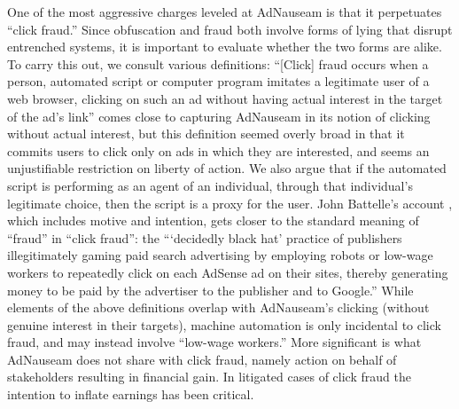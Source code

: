 \documentclass[conference]{IEEEtran}
\begin{document}
One of the most aggressive charges leveled at AdNauseam is that it perpetuates “click fraud.” Since obfuscation and fraud both involve forms of lying that disrupt entrenched systems, it is important to evaluate whether the two forms are alike. To carry this out, we consult various definitions: “[Click] fraud occurs when a person, automated script or computer program imitates a legitimate user of a web browser, clicking on such an ad without having actual interest in the target of the ad's link” \cite{Liu} comes close to capturing AdNauseam in its notion of clicking without actual interest, but this definition seemed overly broad in that it commits users to click only on ads in which they are interested, and seems an unjustifiable restriction on liberty of action. We also argue that if the automated script is performing as an agent of an individual, through that individual's legitimate choice, then the script is a proxy for the user. John Battelle's account \cite{Battelle}, which includes motive and intention, gets closer to the standard meaning of “fraud” in “click fraud”: the “‘decidedly black hat’ practice of publishers illegitimately gaming paid search advertising by employing robots or low-wage workers to repeatedly click on each AdSense ad on their sites, thereby generating money to be paid by the advertiser to the publisher and to Google.” While elements of the above definitions overlap with AdNauseam's clicking (without genuine interest in their targets), machine automation is only incidental to click fraud, and may instead involve “low-wage workers.” More significant is what AdNauseam does not share with click fraud, namely action on behalf of stakeholders resulting in financial gain. In litigated cases of click fraud the intention to inflate earnings has been critical.
\end{document}
